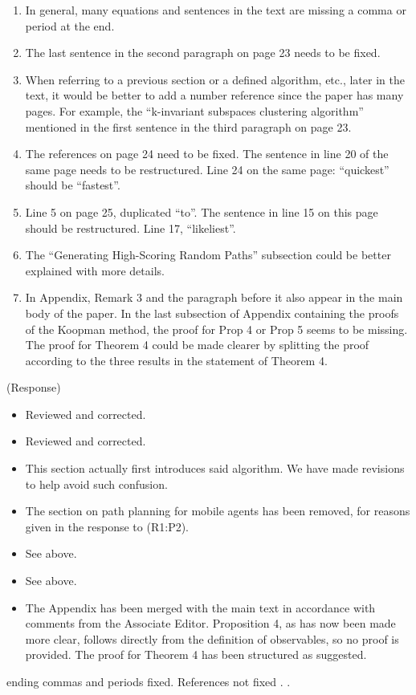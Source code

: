 \documentclass{letter}
\begin{document}
\begin{enumerate}
	\item In general, many equations and sentences in the text are missing a
	comma or period at the end.
	\item The last sentence in the second paragraph on page 23 needs to be fixed.
	\item When referring to a previous section or a defined algorithm, etc., later in the text, it would be better to add a number reference since the paper has many pages. For example, the “k-invariant subspaces clustering algorithm” mentioned in the first sentence in the third paragraph on page 23.
	\item The references on page 24 need to be fixed. The sentence in line 20 of the same page needs to be restructured. Line 24 on the same page: 	“quickest” should be “fastest”.
	\item Line 5 on page 25, duplicated “to”. The sentence in line 15 on this page should be restructured. Line 17, “likeliest”.
	\item The “Generating High-Scoring Random Paths” subsection could be better explained with more details.
	\item In Appendix, Remark 3 and the paragraph before it also appear in the main body of the paper. In the last subsection of Appendix containing the proofs of the Koopman method, the proof for Prop 4 or Prop 5 seems to be missing. The proof for Theorem 4 could be made clearer by splitting the proof according to the three results in the statement of Theorem 4.
\end{enumerate}

{\color{red}(Response)}
\begin{itemize}
	\item Reviewed and corrected.
	\item Reviewed and corrected.
	\item This section actually first introduces said algorithm. We have made revisions to help avoid such confusion.
	\item The section on path planning for mobile agents has been removed, for reasons given in the response to {\color{red}(R1:P2)}.
	\item See above.
	\item See above.
	\item The Appendix has been merged with the main text in accordance with comments from the Associate Editor. Proposition 4, as has now been made more clear, follows directly from the definition of observables, so no proof is provided. The proof for Theorem 4 has been structured as suggested.
\end{itemize}
ending commas and periods fixed. References not fixed . . 
\end{document}
